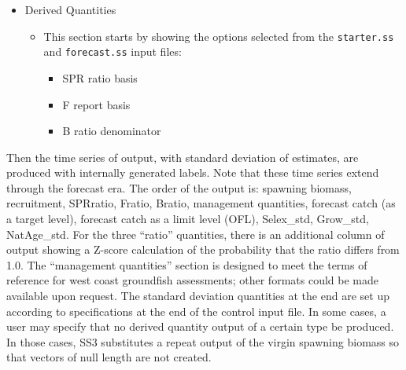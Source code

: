 \begin{itemize}
\begin{itemize}
		\end{itemize}
	\item Derived Quantities
		\begin{itemize}
			\item This section starts by showing the options selected from the \texttt{starter.ss} and \texttt{forecast.ss} input files:
				\begin{itemize}
					\item SPR ratio basis
					\item F report basis
					\item B ratio denominator
				\end{itemize}
		\end{itemize}
\end{itemize}

Then the time series of output, with standard deviation of estimates, are produced with internally generated labels. Note that these time series extend through the forecast era. The order of the output is: spawning biomass, recruitment, SPRratio, Fratio, Bratio, management quantities, forecast catch (as a target level), forecast catch as a limit level (OFL), Selex\_std, Grow\_std, NatAge\_std. For the three ``ratio'' quantities, there is an additional column of output showing a Z-score calculation of the probability that the ratio differs from 1.0. The ``management quantities'' section is designed to meet the terms of reference for west coast groundfish assessments; other formats could be made available upon request. The standard deviation quantities at the end are set up according to specifications at the end of the control input file. In some cases, a user may specify that no derived quantity output of a certain type be produced. In those cases, SS3 substitutes a repeat output of the virgin spawning biomass so that vectors of null length are not created.

